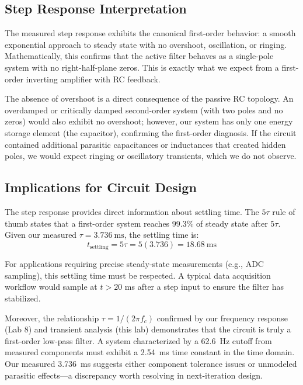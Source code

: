 \documentclass[11pt]{article}
\begin{document}
\subsection{Step Response Interpretation}

The measured step response exhibits the canonical first-order behavior: a smooth exponential approach to steady state with no overshoot, oscillation, or ringing. Mathematically, this confirms that the active filter behaves as a single-pole system with no right-half-plane zeros. This is exactly what we expect from a first-order inverting amplifier with RC feedback.

The absence of overshoot is a direct consequence of the passive RC topology. An overdamped or critically damped second-order system (with two poles and no zeros) would also exhibit no overshoot; however, our system has only one energy storage element (the capacitor), confirming the first-order diagnosis. If the circuit contained additional parasitic capacitances or inductances that created hidden poles, we would expect ringing or oscillatory transients, which we do not observe.

\subsection{Implications for Circuit Design}

The step response provides direct information about settling time. The $5\tau$ rule of thumb states that a first-order system reaches 99.3\% of steady state after $5\tau$. Given our measured $\tau = \SI{3.736}{\milli\second}$, the settling time is:
\[ t_{\text{settling}} = 5\tau = 5 (3.736) = \SI{18.68}{\milli\second} \]

For applications requiring precise steady-state measurements (e.g., ADC sampling), this settling time must be respected. A typical data acquisition workflow would sample at $t > 20$ ms after a step input to ensure the filter has stabilized.

Moreover, the relationship $\tau = 1/(2\pi f_c)$ confirmed by our frequency response (Lab 8) and transient analysis (this lab) demonstrates that the circuit is truly a first-order low-pass filter. A system characterized by a \SI{62.6}{\hertz} cutoff from measured components must exhibit a \SI{2.54}{\milli\second} time constant in the time domain. Our measured \SI{3.736}{\milli\second} suggests either component tolerance issues or unmodeled parasitic effects—a discrepancy worth resolving in next-iteration design.
\end{document}
